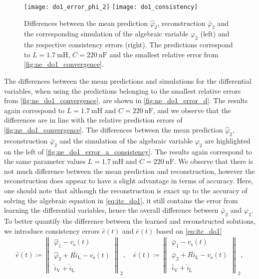 \documentclass[AMA,STIX1COL]{WileyNJD-v2}
\newcommand{\mr}[1]{\mathrm{#1}}
\begin{document}
\begin{figure}[b]
    \begin{center}
        \texttt{[image: do1\_error\_phi\_2]} \hspace{1.5cm} \texttt{[image: do1\_consistency]}
    \end{center}
    \caption{Differences between the mean prediction $\hat{\varphi}_2$, reconstruction $\bar{\varphi}_2$ and the corresponding simulation of the algebraic variable $\varphi_2$ (left) and the respective consistency errors (right). The predictions correspond to $L = \SI{1.7}{\milli\henry}$, $C = \SI{220}{\nano\farad}$ and the smallest relative error from \autoref{fig:ne_do1_convergence}.}
    \label{fig:ne_do1_error_a_consistency}
\end{figure}
The differences between the mean predictions and simulations for the differential variables, when using the predictions belonging to the smallest relative errors from \autoref{fig:ne_do1_convergence}, are shown in \autoref{fig:ne_do1_error_d}. The results again correspond to $L = \SI{1.7}{\milli\henry}$ and $C = \SI{220}{\nano\farad}$, and we observe that the differences are in line with the relative prediction errors of \autoref{fig:ne_do1_convergence}. The differences between the mean prediction $\hat{\varphi}_2$, reconstruction $\bar{\varphi}_2$ and the simulation of the algebraic variable $\varphi_2$ are highlighted on the left of \autoref{fig:ne_do1_error_a_consistency}. The results again correspond to the same parameter values $L = \SI{1.7}{\milli\henry}$ and $C = \SI{220}{\nano\farad}$. We observe that there is not much difference between the mean prediction and reconstruction, however the reconstruction does appear to have a slight advantage in terms of accuracy. Here, one should note that although the reconstruction is exact up to the accuracy of solving the algebraic equation in \eqref{eq:itc_do1}, it still contains the error from learning the differential variables, hence the overall difference between $\bar{\varphi}_2$ and $\varphi_2$. To better quantify the difference between the learned and reconstructed solutions, we introduce consistency errors $\hat{e}(t)$ and $\bar{e}(t)$ based on \eqref{eq:itc_do1}
\begin{align*}
    \hat{e}(t) \coloneqq \begin{Vmatrix}
        \hat{\varphi}_1 - v_\mr{s}(t)\\
        \hat{\varphi}_2 + R \hat{i}_\mr{L} - v_\mr{s}(t)\\
        \hat{i}_\mr{V} + \hat{i}_\mr{L}
    \end{Vmatrix}_2, \quad \bar{e}(t) \coloneqq \begin{Vmatrix}
        \bar{\varphi}_1 - v_\mr{s}(t)\\
        \bar{\varphi}_2 + R \hat{i}_\mr{L} - v_\mr{s}(t)\\
        \bar{i}_\mr{V} + \hat{i}_\mr{L}
    \end{Vmatrix}_2,
\end{align*}
\end{document}
